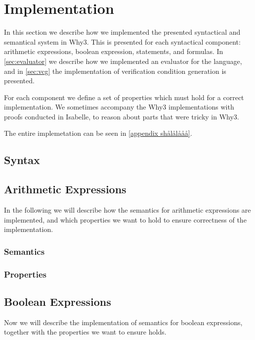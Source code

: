 \section{Implementation}
In this section we describe how we implemented the presented syntactical and semantical system
in Why3. This is presented for each syntactical component: arithmetic expressions, boolean expression, statements, and formulas. In \ref{sec:evaluator} we describe how we implemented
an evaluator for the language, and in \ref{sec:vcg} the implementation of verification
condition generation is presented.

For each component we define a set of properties which must hold for a correct implementation.
We sometimes accompany the Why3 implementations with proofs conducted in Isabelle, to reason
about parts that were tricky in Why3.

The entire implemetation can be seen in \autoref{appendix shålålååå}.

\subsection{Syntax}


\subsection{Arithmetic Expressions}
In the following we will describe how the semantics for arithmetic expressions are implemented,
and which properties we want to hold to ensure correctness of the implementation.

\subsubsection{Semantics}


\subsubsection{Properties}\label{sec:aprops}


\subsection{Boolean Expressions}
Now we will describe the implementation of semantics for boolean expressions, together with
the properties we want to ensure holds.



